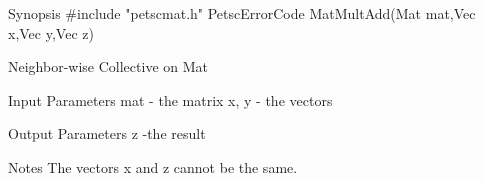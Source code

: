 Synopsis
#include "petscmat.h" 
PetscErrorCode MatMultAdd(Mat mat,Vec x,Vec y,Vec z)

Neighbor-wise Collective on Mat

Input Parameters
mat 	- the matrix
x, y 	- the vectors

Output Parameters
z -the result

Notes
The vectors x and z cannot be the same.
